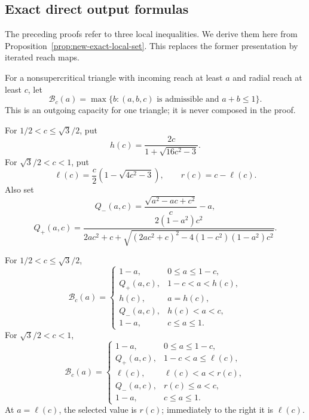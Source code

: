 \subsection{Exact direct output formulas}
\label{subsec:new-direct-output-formulas}

The preceding proofs refer to three local inequalities.  We derive them here
from Proposition~\ref{prop:new-exact-local-set}.  This replaces the former
presentation by iterated reach maps.

For a nonsupercritical triangle with incoming reach at least $a$ and radial
reach at least $c$, let
\[
 \mathcal B_c(a)=
 \max\{b:(a,b,c)\text{ is admissible and }a+b\le1\}.
\]
This is an outgoing capacity for one triangle; it is never composed in the
proof.

For $1/2<c\le\sqrt3/2$, put
\[
 h(c)=\frac{2c}{1+\sqrt{16c^2-3}}.
\]
For $\sqrt3/2<c<1$, put
\[
 \ell(c)=\frac c2\left(1-\sqrt{4c^2-3}\right),
 \qquad r(c)=c-\ell(c).
\]
Also set
\[
 Q_-(a,c)=\frac{\sqrt{a^2-ac+c^2}}c-a,
\]
\[
 Q_+(a,c)=
 \frac{2(1-a^2)c^2}
 {2ac^2+c+
 \sqrt{(2ac^2+c)^2-4(1-c^2)(1-a^2)c^2}}.
\]

\begin{proposition}
\label{prop:new-four-direct-outputs}
For $1/2<c\le\sqrt3/2$,
\[
 \mathcal B_c(a)=
 \begin{cases}
  1-a,&0\le a\le1-c,\\
  Q_+(a,c),&1-c<a<h(c),\\
  h(c),&a=h(c),\\
  Q_-(a,c),&h(c)<a<c,\\
  1-a,&c\le a\le1.
 \end{cases}
 \tag{6.66}
\]
For $\sqrt3/2<c<1$,
\[
 \mathcal B_c(a)=
 \begin{cases}
  1-a,&0\le a\le1-c,\\
  Q_+(a,c),&1-c<a\le\ell(c),\\
  \ell(c),&\ell(c)<a<r(c),\\
  Q_-(a,c),&r(c)\le a<c,\\
  1-a,&c\le a\le1.
 \end{cases}
 \tag{6.67}
\]
At $a=\ell(c)$, the selected value is $r(c)$; immediately to the right it is
$\ell(c)$.
\end{proposition}

